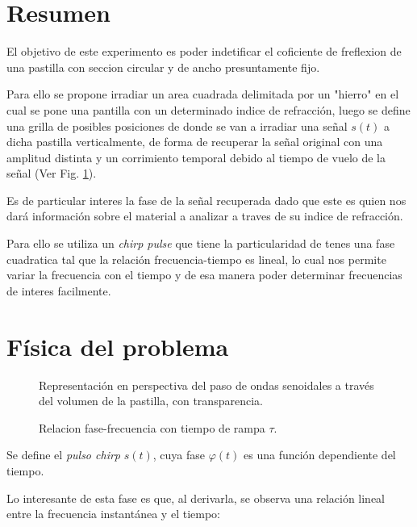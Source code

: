 
\section{Resumen}

El objetivo de este experimento es poder indetificar el coficiente de freflexion de una pastilla con seccion circular y de ancho presuntamente fijo.

Para ello se propone irradiar un area cuadrada delimitada por un "hierro" en el cual se pone una pantilla con un determinado indice de refracción, luego se define una grilla de posibles posiciones de donde se van a irradiar una señal $s(t)$ a dicha pastilla verticalmente, de forma de recuperar la señal original con una amplitud distinta y un corrimiento temporal debido al tiempo de vuelo de la señal (Ver Fig. \ref{fig:pastilla_transparente}).

Es de particular interes la fase de la señal recuperada dado que este es quien nos dará información sobre el material a analizar a traves de su indice de refracción.

Para ello se utiliza un \textit{chirp pulse} que tiene la particularidad de tenes una fase cuadratica tal que la relación frecuencia-tiempo es lineal, lo cual nos permite variar la frecuencia con el tiempo y de esa manera poder determinar frecuencias de interes facilmente.

\section{Física del problema}


\begin{figure}[H]
    \centering
        \resizebox{1.04\textwidth}{!}{%
        }
        \caption{Representación en perspectiva del paso de ondas senoidales a través del volumen de la pastilla, con transparencia.}
    \label{fig:pastilla_transparente}
\end{figure}


\begin{figure}[H]
    \centering
    \resizebox{1.04\textwidth}{!}{%
    }
    \caption{Relacion fase-frecuencia con tiempo de rampa $\tau$.}
    \label{fig:chirp_fig}
\end{figure}
Se define el \textit{pulso chirp} $s(t)$, cuya fase $\varphi(t)$ es una función dependiente del tiempo.

Lo interesante de esta fase es que, al derivarla, se observa una relación lineal entre la frecuencia instantánea y el tiempo:

